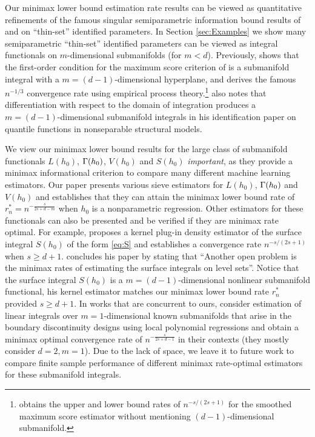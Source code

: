 \documentclass[12pt,american]{article}
\theoremstyle{definition}
\theoremstyle{plain}
\theoremstyle{definition}
\theoremstyle{plain}
\theoremstyle{plain}
\theoremstyle{plain}
\theoremstyle{plain}
\theoremstyle{plain}
\begin{document}
Our minimax lower bound estimation rate results can be viewed as quantitative refinements of the famous singular semiparametric information bound results of \cite{chamberlain1986asymptotic} and \citet*{khan2010irregular} on ``thin-set'' identified parameters. In Section \ref{sec:Examples} we show many semiparametric ``thin-set'' identified parameters can be viewed as integral functionals on $m$-dimensional submanifolds (for $m<d$). Previously, \citet*{kim1990cube} shows that the first-order condition for the maximum score criterion of \citet*{manski1975maximum} is a submanifold integral with a $m=(d-1)$-dimensional hyperplane, and derives the famous $n^{-1/3}$ convergence rate using empirical process theory.\footnote{\cite{horowitz1992smoothed,horowitz1993et} obtains the upper and lower bound rates of $n^{-s/(2s+1)}$ for the smoothed maximum score estimator without mentioning $(d-1)$-dimensional submanifold.} \citet*{sasaki2015quantile} also notes that differentiation
with respect to the domain of integration produces a $m=(d-1)$-dimensional
submanifold integrals in his identification paper on quantile functions in nonseparable structural models.

We view our minimax lower bound results for the large class of submanifold functionals $L(h_0)$, $\Gamma (h_0)$, $V(h_0)$ and $S(h_0)$ \textit{important}, as they provide a minimax informational criterion to compare many different machine learning estimators. Our paper presents various sieve estimators for $L(h_0)$, $\Gamma(h_0)$ and $V(h_0)$ and establishes that they can attain the minimax lower bound rate of $r^*_n=n^{-\frac{s}{2s+d-m}}$ when $h_0$ is a nonparametric regression. Other estimators for these functionals can also be presented and be verified if they are minimax rate optimal. For example, \citet*{qiao2021nonparametric} proposes a kernel plug-in density estimator of the surface integral $S(h_0)$ of the form \eqref{eq:S} and establishes a convergence rate $n^{-s/(2s+1)}$ when $s\geq d+1$. \citet*{qiao2021nonparametric} concludes his paper by stating that ``Another open problem is the minimax rates of estimating the surface integrals on level sets''. Notice that the surface integral $S(h_0)$ is a $m=(d-1)$-dimensional nonlinear submanifold functional, his kernel estimator matches our minimax lower bound rate $r^*_n$ provided $s\geq d+1$.
In works that are concurrent to ours, \citet*{cattaneo2025dist,cattaneo2025loc} consider estimation of linear integrals over $m=1$-dimensional known submanifolds that arise in the boundary discontinuity designs using local polynomial regressions and obtain a minimax optimal convergence rate of $n^{-\frac{s}{2s+d-1}}$ in their contexts (they mostly consider $d=2,m=1$). Due to the lack of space, we leave it to future work to compare finite sample performance of different minimax rate-optimal estimators for these submanifold integrals.
\end{document}
